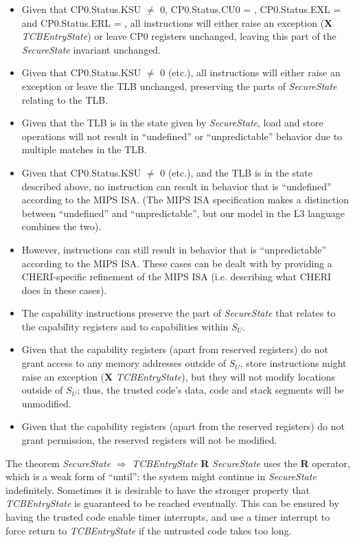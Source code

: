 \begin{itemize}
\item
Given that CP0.Status.KSU $\neq$ 0, CP0.Status.CU0 = \algorithmicfalse{},
CP0.Status.EXL = \algorithmicfalse{} and CP0.Status.ERL = \algorithmicfalse{},
all instructions will either raise an exception (\textbf{X}
\emph{TCBEntryState}) or leave CP0 registers unchanged, leaving this 
part of the \emph{SecureState} invariant unchanged.
\item
Given that CP0.Status.KSU $\neq$ 0 (etc.), all instructions will
either raise an exception or leave the TLB unchanged, preserving the parts of
\emph{SecureState} relating to the TLB.
\item
Given that the TLB is in the state given by \emph{SecureState}, load and store
operations will not result in ``undefined'' or ``unpredictable'' behavior due
to multiple matches in the TLB.
\item
Given that CP0.Status.KSU $\neq$ 0 (etc.), and the TLB is in the state
described above, no instruction can result in
behavior that is ``undefined'' according to the MIPS ISA. (The MIPS ISA
specification makes a distinction between ``undefined'' and ``unpredictable'',
but our model in the L3 language combines the two).
\item
However, instructions can still result in behavior that is ``unpredictable''
according to the MIPS ISA. These cases can be dealt with by providing a
CHERI-specific refinement of the MIPS ISA (i.e. describing what CHERI does in
these cases).
\item
The capability instructions preserve the part of \emph{SecureState} that
relates to the capability registers and to capabilities within $S_U$.
\item
Given that the capability registers (apart from reserved registers) do not grant
access to any memory addresses outside of $S_U$, store instructions might raise
an exception (\textbf{X} \emph{TCBEntryState}), but they will not modify locations
outside of $S_U$; thus, the trusted code's data, code and stack segments
 will be unmodified.
\item
Given that the capability registers (apart from the reserved registers) do
not grant \cappermASR* permission, the reserved
registers will not be modified.
\end{itemize}

The theorem \emph{SecureState} $\Rightarrow$ \emph{TCBEntryState} \textbf{R}
\emph{SecureState} uses the \textbf{R} operator, which is a weak form of
``until'': the system might continue in \emph{SecureState} indefinitely.
Sometimes it is desirable to have the stronger property that 
\emph{TCBEntryState} is guaranteed to be reached eventually. This can be
ensured by having the trusted code enable timer interrupts, and use a
timer interrupt to force return to \emph{TCBEntryState} if the untrusted
code takes too long.

